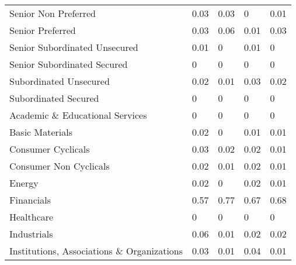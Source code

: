 \begin{table}[]
\begin{tabular}{lllll}
Senior Non   Preferred & \cellcolor[HTML]{F8FBFC}0.03 & \cellcolor[HTML]{F8FBFC}0.03 & \cellcolor[HTML]{FCFCFF}0 & \cellcolor[HTML]{FBFCFE}0.01 \\
Senior Preferred & \cellcolor[HTML]{F8FBFC}0.03 & \cellcolor[HTML]{F3F9F8}0.06 & \cellcolor[HTML]{FBFCFE}0.01 & \cellcolor[HTML]{F8FBFC}0.03 \\
Senior   Subordinated Unsecured & \cellcolor[HTML]{FBFCFE}0.01 & \cellcolor[HTML]{FCFCFF}0 & \cellcolor[HTML]{FBFCFE}0.01 & \cellcolor[HTML]{FCFCFF}0 \\
Senior   Subordinated Secured & \cellcolor[HTML]{FCFCFF}0 & \cellcolor[HTML]{FCFCFF}0 & \cellcolor[HTML]{FCFCFF}0 & \cellcolor[HTML]{FCFCFF}0 \\
Subordinated   Unsecured & \cellcolor[HTML]{F9FBFD}0.02 & \cellcolor[HTML]{FBFCFE}0.01 & \cellcolor[HTML]{F8FBFC}0.03 & \cellcolor[HTML]{F9FBFD}0.02 \\
Subordinated   Secured & \cellcolor[HTML]{FCFCFF}0 & \cellcolor[HTML]{FCFCFF}0 & \cellcolor[HTML]{FCFCFF}0 & \cellcolor[HTML]{FCFCFF}0 \\
Academic   \& Educational Services & \cellcolor[HTML]{FCFCFF}0 & \cellcolor[HTML]{FCFCFF}0 & \cellcolor[HTML]{FCFCFF}0 & \cellcolor[HTML]{FCFCFF}0 \\
Basic Materials & \cellcolor[HTML]{F9FBFD}0.02 & \cellcolor[HTML]{FCFCFF}0 & \cellcolor[HTML]{FBFCFE}0.01 & \cellcolor[HTML]{FBFCFE}0.01 \\
Consumer   Cyclicals & \cellcolor[HTML]{F8FBFC}0.03 & \cellcolor[HTML]{F9FBFD}0.02 & \cellcolor[HTML]{F9FBFD}0.02 & \cellcolor[HTML]{FBFCFE}0.01 \\
Consumer   Non Cyclicals & \cellcolor[HTML]{F9FBFD}0.02 & \cellcolor[HTML]{FBFCFE}0.01 & \cellcolor[HTML]{F9FBFD}0.02 & \cellcolor[HTML]{FBFCFE}0.01 \\
Energy & \cellcolor[HTML]{F9FBFD}0.02 & \cellcolor[HTML]{FCFCFF}0 & \cellcolor[HTML]{F9FBFD}0.02 & \cellcolor[HTML]{FBFCFE}0.01 \\
Financials & \cellcolor[HTML]{A5D9B4}0.57 & \cellcolor[HTML]{87CD9A}0.77 & \cellcolor[HTML]{96D3A7}0.67 & \cellcolor[HTML]{94D2A6}0.68 \\
Healthcare & \cellcolor[HTML]{FCFCFF}0 & \cellcolor[HTML]{FCFCFF}0 & \cellcolor[HTML]{FCFCFF}0 & \cellcolor[HTML]{FCFCFF}0 \\
Industrials & \cellcolor[HTML]{F3F9F8}0.06 & \cellcolor[HTML]{FBFCFE}0.01 & \cellcolor[HTML]{F9FBFD}0.02 & \cellcolor[HTML]{F9FBFD}0.02 \\
Institutions,   Associations \& Organizations & \cellcolor[HTML]{F8FBFC}0.03 & \cellcolor[HTML]{FBFCFE}0.01 & \cellcolor[HTML]{F6FAFA}0.04 & \cellcolor[HTML]{FBFCFE}0.01 \\

\end{tabular}
\end{table}
